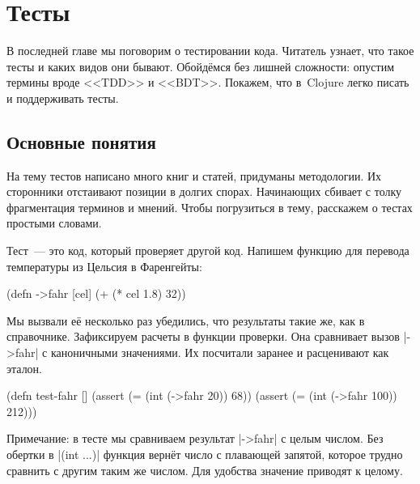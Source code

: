\chapter{Тесты}


\label{chapter-tests}

\begin{teaser}
В последней главе мы поговорим о тестировании кода. Читатель узнает, что такое
тесты и каких видов они бывают. Обойдёмся без лишней сложности: опустим
термины вроде <<TDD>> и <<BDT>>. Покажем, что в~Clojure легко писать и
поддерживать тесты.
\end{teaser}

\section{Основные понятия}

На тему тестов написано много книг и статей, придуманы методологии. Их
сторонники отстаивают позиции в долгих спорах. Начинающих сбивает с толку
фрагментация терминов и мнений. Чтобы погрузиться в тему, расскажем о тестах
простыми словами.


Тест~--- это код, который проверяет другой код. Напишем функцию для перевода
температуры из Цельсия в Фаренгейты:

\begin{english}
  \begin{clojure}
(defn ->fahr [cel]
  (+ (* cel 1.8) 32))
  \end{clojure}
\end{english}


Мы вызвали её несколько раз убедились, что результаты такие же, как в
справочнике. Зафиксируем расчеты в функции проверки. Она сравнивает вызов
\spverb|->fahr| с каноничными значениями. Их посчитали заранее и расценивают как
эталон.

\begin{english}
  \begin{clojure}
(defn test-fahr []
  (assert (= (int (->fahr 20)) 68))
  (assert (= (int (->fahr 100)) 212)))
  \end{clojure}
\end{english}


Примечание: в тесте мы сравниваем результат \spverb|->fahr| с целым числом. Без
обертки в \spverb|(int ...)| функция вернёт число с плавающей запятой, которое
трудно сравнить с другим таким же числом. Для удобства значение приводят к
целому.

